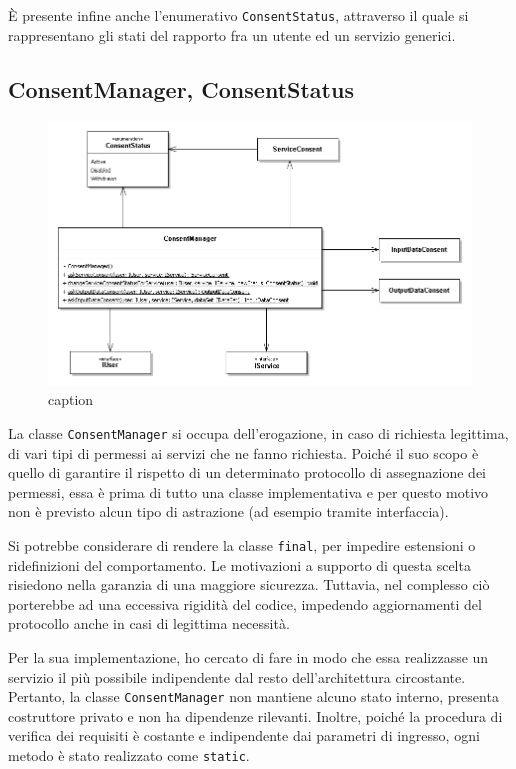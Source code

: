 \`E presente infine anche l’enumerativo \texttt{ConsentStatus}, attraverso il quale si rappresentano gli stati del rapporto fra un utente ed un servizio generici.


\subsection{ConsentManager, ConsentStatus}
\begin{figure} [h]
	\includegraphics[width=\linewidth]{pictures/Auth-CM.png}
	\caption{caption}
	\label{fig:Auth-CM}
\end{figure}
La classe \texttt{ConsentManager} si occupa dell’erogazione, in caso di richiesta legittima, di vari tipi di permessi ai servizi che ne fanno richiesta. Poich\'e il suo scopo \`e quello di garantire il rispetto di un determinato protocollo di assegnazione dei permessi, essa \`e prima di tutto una classe implementativa e per questo motivo non \`e previsto alcun tipo di astrazione (ad esempio tramite interfaccia).

Si potrebbe considerare di rendere la classe \texttt{final}, per impedire estensioni o ridefinizioni del comportamento. Le motivazioni a supporto di questa scelta risiedono nella garanzia di una maggiore sicurezza. Tuttavia, nel complesso ci\`o porterebbe ad una eccessiva rigidit\`a del codice, impedendo aggiornamenti del protocollo anche in casi di legittima necessit\`a.

Per la sua implementazione, ho cercato di fare in modo che essa realizzasse un servizio il pi\`u possibile indipendente dal resto dell’architettura circostante. Pertanto, la classe \texttt{ConsentManager} non mantiene alcuno stato interno, presenta costruttore privato e non ha dipendenze rilevanti. Inoltre, poich\'e la procedura di verifica dei requisiti \`e costante e indipendente dai parametri di ingresso, ogni metodo \`e stato realizzato come \texttt{static}. 

